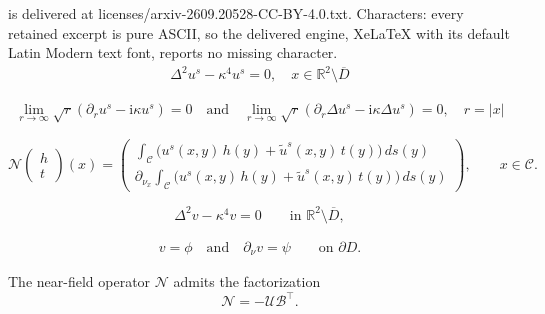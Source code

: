 \documentclass[10pt,a4paper]{amsart}
\begin{document}
is delivered at licenses/arxiv-2609.20528-CC-BY-4.0.txt. Characters: every retained excerpt is pure ASCII, so the delivered engine, XeLaTeX with its default Latin Modern text font, reports no missing character.
\begin{align}\label{eqnbcs}
    \Delta^2u^s-\kappa^4u^s=0,\quad x\in\mathbb R^2\setminus\overline D
\end{align}

\begin{align}\label{SRCs}
    \lim_{r\to\infty} \sqrt{r}(\partial_r u^s-\mathrm{i}\kappa u^s)=0\quad \text{and}\quad \lim_{r\to\infty} \sqrt{r}(\partial_r \Delta u^s-\mathrm{i}\kappa \Delta u^s)=0, \quad r=|x|
\end{align}

\begin{equation}\label{NF_operator}
\mathcal N
\begin{pmatrix}
h\\
t
\end{pmatrix}(x)
=
\begin{pmatrix}
\displaystyle
\int_{\mathcal C}
\big(u^{s}(x,y)\,h(y) + \tilde u^{s}(x,y)\,t(y)\big)\,ds(y)
\\[2ex]
\displaystyle
\partial_{\nu_x}
\int_{\mathcal C}
\big(u^{s}(x,y)\,h(y) + \tilde u^{s}(x,y)\,t(y)\big)\,ds(y)
\end{pmatrix},
\qquad x \in \mathcal C.
\end{equation}

\begin{equation}\label{ext_BVP}
\Delta^2 v - \kappa^4 v = 0 
\qquad \text{in } \mathbb{R}^2 \setminus \overline{D},
\end{equation}

\begin{align}\label{clamped_bcs_inhomog}
v = \phi \quad\text{and}\quad \partial_{\nu} v = \psi 
\qquad \text{on } \partial D.
\end{align}

\begin{Lemma}
The near-field operator $\mathcal N$ admits the factorization
\[
\mathcal N=-\mathcal U\mathcal B^\top .
\]
\end{Lemma}
\end{document}
